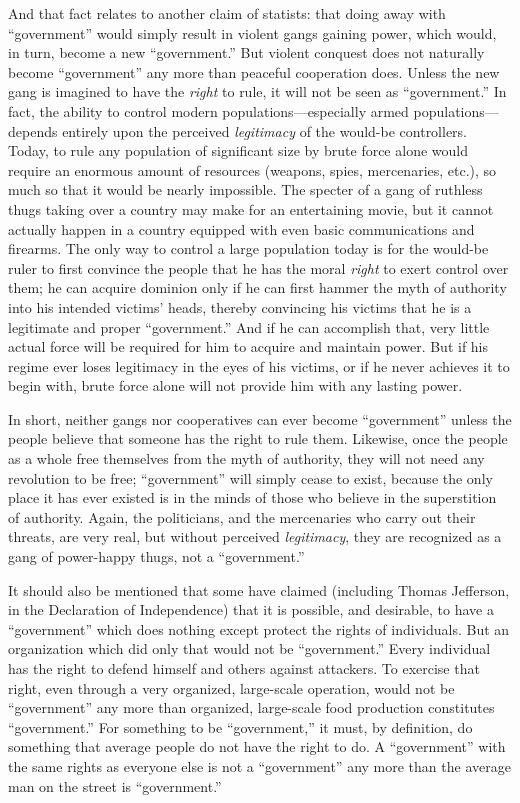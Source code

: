 \documentclass{book}
\begin{document}
And that fact relates to another claim of statists: that doing away with \enquote{government} would simply result in violent gangs gaining power, which would, in turn, become a new \enquote{government.} But violent conquest does not naturally become \enquote{government} any more than peaceful cooperation does. Unless the new gang is imagined to have the \emph{right} to rule, it will not be seen as \enquote{government.} In fact, the ability to control modern populations---especially armed populations---depends entirely upon the perceived \emph{legitimacy} of the would-be controllers. Today, to rule any population of significant size by brute force alone would require an enormous amount of resources (weapons, spies, mercenaries, etc.), so much so that it would be nearly impossible. The specter of a gang of ruthless thugs taking over a country may make for an entertaining movie, but it cannot actually happen in a country equipped with even basic communications and firearms. The only way to control a large population today is for the would-be ruler to first convince the people that he has the moral \emph{right} to exert control over them; he can acquire dominion only if he can first hammer the myth of authority into his intended victims' heads, thereby convincing his victims that he is a legitimate and proper \enquote{government.} And if he can accomplish that, very little actual force will be required for him to acquire and maintain power. But if his regime ever loses legitimacy in the eyes of his victims, or if he never achieves it to begin with, brute force alone will not provide him with any lasting power.

In short, neither gangs nor cooperatives can ever become \enquote{government} unless the people believe that someone has the right to rule them. Likewise, once the people as a whole free themselves from the myth of authority, they will not need any revolution to be free; \enquote{government} will simply cease to exist, because the only place it has ever existed is in the minds of those who believe in the superstition of authority. Again, the politicians, and the mercenaries who carry out their threats, are very real, but without perceived \emph{legitimacy}, they are recognized as a gang of power-happy thugs, not a \enquote{government.}

It should also be mentioned that some have claimed (including Thomas Jefferson, in the Declaration of Independence) that it is possible, and desirable, to have a \enquote{government} which does nothing except protect the rights of individuals. But an organization which did only that would not be \enquote{government.} Every individual has the right to defend himself and others against attackers. To exercise that right, even through a very organized, large-scale operation, would not be \enquote{government} any more than organized, large-scale food production constitutes \enquote{government.} For something to be \enquote{government,} it must, by definition, do something that average people do not have the right to do. A \enquote{government} with the same rights as everyone else is not a \enquote{government} any more than the average man on the street is \enquote{government.}
\end{document}
